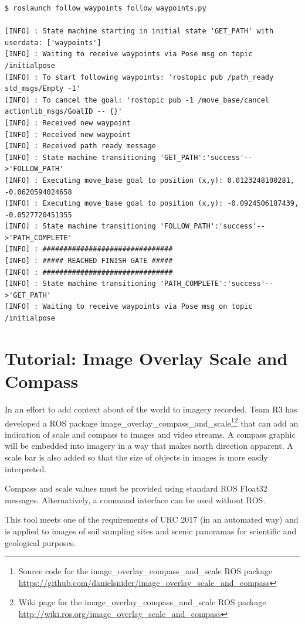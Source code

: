 \documentclass[runningheads,a4paper]{llncs}
\begin{document}
\begin{lstlisting}[frame=single,basicstyle=\ttfamily\scriptsize,breaklines=true]
$ roslaunch follow_waypoints follow_waypoints.py

[INFO] : State machine starting in initial state 'GET_PATH' with userdata: ['waypoints']
[INFO] : Waiting to receive waypoints via Pose msg on topic /initialpose
[INFO] : To start following waypoints: 'rostopic pub /path_ready std_msgs/Empty -1'
[INFO] : To cancel the goal: 'rostopic pub -1 /move_base/cancel actionlib_msgs/GoalID -- {}'
[INFO] : Received new waypoint
[INFO] : Received new waypoint
[INFO] : Received path ready message
[INFO] : State machine transitioning 'GET_PATH':'success'-->'FOLLOW_PATH'
[INFO] : Executing move_base goal to position (x,y): 0.0123248100281, -0.0620594024658
[INFO] : Executing move_base goal to position (x,y): -0.0924506187439, -0.0527720451355
[INFO] : State machine transitioning 'FOLLOW_PATH':'success'-->'PATH_COMPLETE'
[INFO] : ###############################
[INFO] : ##### REACHED FINISH GATE #####
[INFO] : ###############################
[INFO] : State machine transitioning 'PATH_COMPLETE':'success'-->'GET_PATH'
[INFO] : Waiting to receive waypoints via Pose msg on topic /initialpose 
\end{lstlisting}


\section{Tutorial: Image Overlay Scale and Compass}\label{overlay}

In an effort to add context about of the world to imagery recorded, Team R3 has developed a ROS package image\_overlay\_compass\_and\_scale\footnote{Source code for the image\_overlay\_compass\_and\_scale ROS package \url{https://github.com/danielsnider/image_overlay_scale_and_compass}}\footnote{Wiki page for the image\_overlay\_compass\_and\_scale ROS package \url{http://wiki.ros.org/image_overlay_scale_and_compass}} that can add an indication of scale and compass to images and video streams. A compass graphic will be embedded into imagery in a way that makes north direction apparent. A scale bar is also added so that the size of objects in images is more easily interpreted. 

Compass and scale values must be provided using standard ROS Float32 messages. Alternatively, a command interface can be used without ROS. 

This tool meets one of the requirements of URC 2017 (in an automated way) and is applied to images of soil sampling sites and scenic panoramas for scientific and geological purposes.
\end{document}
